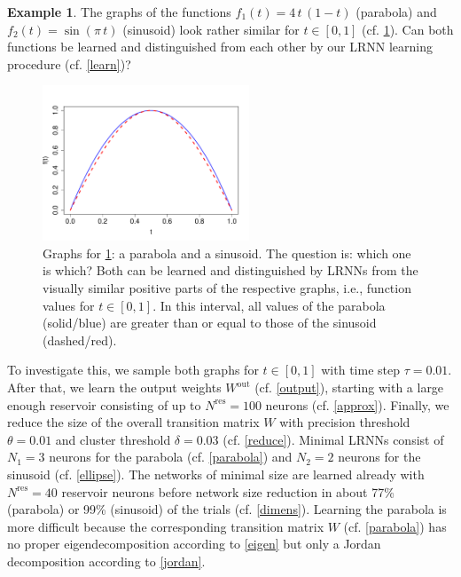 \documentclass[twoside,11pt]{article}
\theoremstyle{definition}
\newtheorem{exmp}{Example}
\begin{document}
\begin{exmp}\label{quest}
The graphs of the functions $f_1(t) = 4\,t\,(1-t)$ (parabola) and $f_2(t) =
\sin(\pi\,t)$ (sinusoid) look rather similar for $t \in [0,1]$ (cf.
\cref{parasin}). Can both functions be learned and distinguished from each other
by our LRNN learning procedure (cf. \cref{learn})?
\end{exmp}

\begin{figure}
        \centering
	\includegraphics[width=0.55\textwidth]{fig/parasin2} %
	\caption{Graphs for \cref{quest}: a parabola and a sinusoid.
	The question is: which one is which? Both can be learned and
	distinguished by LRNNs from the visually similar positive parts of the
	respective graphs, i.e., function values for $t \in [0, 1]$. In this
	interval, all values of the parabola (solid/blue) are greater than or equal
	to those of the sinusoid (dashed/red).}
	\label{parasin}
\end{figure}

To investigate this, we sample both graphs for $t \in [0,1]$ with time step
$\tau=0.01$. After that, we learn the output weights $W^\mathrm{out}$ (cf.
\cref{output}), starting with a large enough reservoir consisting of up to
$N^\mathrm{res} = 100$ neurons (cf. \cref{approx}). Finally, we reduce the
size of the overall transition matrix $W$ with precision threshold $\theta =
0.01$ and cluster threshold $\delta = 0.03$ (cf. \cref{reduce}). Minimal LRNNs consist of $N_1 = 3$ neurons for
the parabola (cf. \cref{parabola}) and $N_2 = 2$ neurons for the sinusoid
(cf. \cref{ellipse}). The networks of minimal size are learned already with
$N^\mathrm{res} = 40$ reservoir neurons before network size reduction in about
77\% (parabola) or 99\% (sinusoid) of the trials (cf. \cref{dimens}).
Learning the parabola is more difficult because the corresponding transition
matrix $W$ (cf. \cref{parabola}) has no proper eigendecomposition according
to \cref{eigen} but only a Jordan decomposition according to \cref{jordan}.
\end{document}
